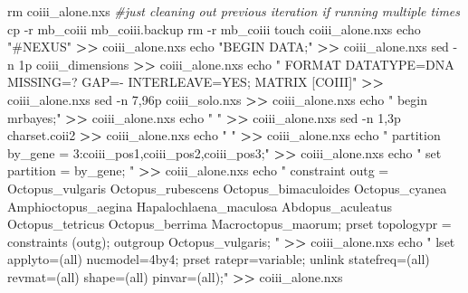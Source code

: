 \documentclass[
]{article}
\newenvironment{Shaded}{\begin{snugshade}}{\end{snugshade}}
\newcommand{\AttributeTok}[1]{\textcolor[rgb]{0.77,0.63,0.00}{#1}}
\newcommand{\BuiltInTok}[1]{#1}
\newcommand{\CommentTok}[1]{\textcolor[rgb]{0.56,0.35,0.01}{\textit{#1}}}
\newcommand{\FunctionTok}[1]{\textcolor[rgb]{0.00,0.00,0.00}{#1}}
\newcommand{\NormalTok}[1]{#1}
\newcommand{\OperatorTok}[1]{\textcolor[rgb]{0.81,0.36,0.00}{\textbf{#1}}}
\newcommand{\StringTok}[1]{\textcolor[rgb]{0.31,0.60,0.02}{#1}}
\begin{document}
\begin{Shaded}
\begin{Highlighting}[]
\FunctionTok{rm}\NormalTok{ coiii\_alone.nxs }\CommentTok{\#just cleaning out previous iteration if running multiple times}
\FunctionTok{cp} \AttributeTok{{-}r}\NormalTok{ mb\_coiii mb\_coiii.backup}
\FunctionTok{rm} \AttributeTok{{-}r}\NormalTok{ mb\_coiii}
\FunctionTok{touch}\NormalTok{ coiii\_alone.nxs}
\BuiltInTok{echo} \StringTok{"\#NEXUS"} \OperatorTok{\textgreater{}\textgreater{}}\NormalTok{ coiii\_alone.nxs}
\BuiltInTok{echo} \StringTok{"BEGIN DATA;"} \OperatorTok{\textgreater{}\textgreater{}}\NormalTok{ coiii\_alone.nxs}
\FunctionTok{sed} \AttributeTok{{-}n}\NormalTok{ 1p coiii\_dimensions }\OperatorTok{\textgreater{}\textgreater{}}\NormalTok{ coiii\_alone.nxs}
\BuiltInTok{echo} \StringTok{"  FORMAT DATATYPE=DNA MISSING=? GAP={-} INTERLEAVE=YES;}
\StringTok{  MATRIX}
\StringTok{  }
\StringTok{  [COIII]"} \OperatorTok{\textgreater{}\textgreater{}}\NormalTok{ coiii\_alone.nxs}
\FunctionTok{sed} \AttributeTok{{-}n}\NormalTok{ 7,96p coiii\_solo.nxs }\OperatorTok{\textgreater{}\textgreater{}}\NormalTok{ coiii\_alone.nxs}
\BuiltInTok{echo} \StringTok{"}
\StringTok{begin mrbayes;"} \OperatorTok{\textgreater{}\textgreater{}}\NormalTok{ coiii\_alone.nxs}
\BuiltInTok{echo} \StringTok{" "} \OperatorTok{\textgreater{}\textgreater{}}\NormalTok{ coiii\_alone.nxs}
\FunctionTok{sed} \AttributeTok{{-}n}\NormalTok{ 1,3p charset.coii2 }\OperatorTok{\textgreater{}\textgreater{}}\NormalTok{ coiii\_alone.nxs}
\BuiltInTok{echo} \StringTok{" "} \OperatorTok{\textgreater{}\textgreater{}}\NormalTok{ coiii\_alone.nxs}
\BuiltInTok{echo} \StringTok{"      partition by\_gene = 3:coiii\_pos1,coiii\_pos2,coiii\_pos3;"} \OperatorTok{\textgreater{}\textgreater{}}\NormalTok{ coiii\_alone.nxs}
\BuiltInTok{echo} \StringTok{"      set partition = by\_gene;}
\StringTok{"} \OperatorTok{\textgreater{}\textgreater{}}\NormalTok{ coiii\_alone.nxs}
\BuiltInTok{echo} \StringTok{"      constraint outg = Octopus\_vulgaris Octopus\_rubescens Octopus\_bimaculoides Octopus\_cyanea Amphioctopus\_aegina Hapalochlaena\_maculosa Abdopus\_aculeatus Octopus\_tetricus Octopus\_berrima Macroctopus\_maorum;}
\StringTok{        prset topologypr = constraints (outg);}
\StringTok{        outgroup Octopus\_vulgaris;}
\StringTok{        "} \OperatorTok{\textgreater{}\textgreater{}}\NormalTok{ coiii\_alone.nxs}
\BuiltInTok{echo} \StringTok{"      lset applyto=(all)   nucmodel=4by4;}
\StringTok{        prset ratepr=variable;}
\StringTok{        unlink statefreq=(all) revmat=(all) shape=(all) pinvar=(all);"} \OperatorTok{\textgreater{}\textgreater{}}\NormalTok{ coiii\_alone.nxs}


\end{Highlighting}
\end{Shaded}
\end{document}
